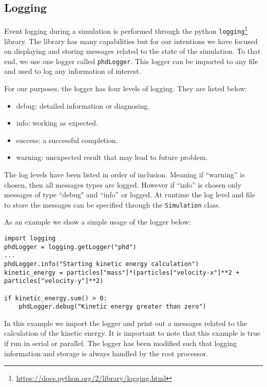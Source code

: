 \subsection{Logging}
\label{sec.logging}
Event logging during a simulation is performed through the python 
\texttt{logging}\footnote{\url{https://docs.python.org/2/library/logging.html}} library. The library has 
many capabilities but for our intentions we have focused on displaying and storing messages related to the
state of the simulation. To that end, we use one logger called \lstinline{phdLogger}. This 
logger can be imported to any file and used to log any information of interest.

For our purposes, the logger has four levels of logging. They are listed below:
\begin{itemize}
	\item debug: detailed information or diagnosing.
    \item info: working as expected.
    \item success: a successful completion. 
    \item warning: unexpected result that may lead to future problem.
\end{itemize}
The log levels have been listed in order of inclusion. Meaning if ``warning'' is chosen, then all messages
types are logged. However if ``info'' is chosen only messages of type ``debug" and ``info'' or logged.
At runtime the log level and file to store the messages can be specified through the 
\lstinline{Simulation} class.

As an example we show a simple usage of the logger below:
\begin{lstlisting}
import logging
phdLogger = logging.getLogger("phd")
...
phdLogger.info("Starting kinetic energy calculation")
kinetic_energy = particles["mass"]*(particles["velocity-x"]**2 + particles["velocity-y"]**2)

if kinetic_energy.sum() > 0:
	phdLogger.debug("Kinetic energy greater than zero")
\end{lstlisting}
In this example we import the logger and print out a messages related to the calculation of the
kinetic energy. It is important to note that this example is true if run in serial or parallel. The logger
has been modified such that logging information and storage is always handled by the root processor.
